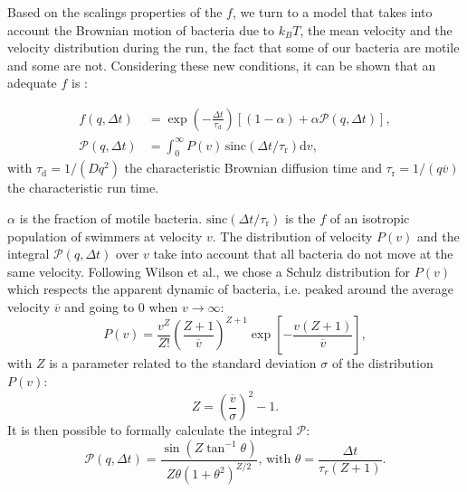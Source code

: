 \documentclass[prb,reprint,amsmath,amssymb]{revtex4-1}
\newcommand{\tg}[1]{{\color{magenta}#1}} %
\begin{document}
Based on the scalings properties of the $f$, we turn to a model that takes into account \tg{the Brownian motion of bacteria due to $k_BT$, the mean velocity and the velocity distribution during the run, the fact that some of our bacteria are motile and some are not. Considering these new conditions, it can be shown that an adequate $f$ is \citep{1_BactMobil}}:

\begin{align}
f(q, \Delta t) &= \exp\left(-\frac{\Delta t}{\tau_\text{d}}\right)\left[(1-\alpha) + \alpha \mathcal{P}(q, \Delta t)\right],\label{eq:fbact}\\
\mathcal{P}(q, \Delta t) &= \int_{0}^{\infty} P(v)\, \text{sinc}(\Delta t/\tau_\text{r}) \mathrm{d}v,
\end{align}
with $\tau_\text{d} = 1/(Dq^2)$ the characteristic Brownian diffusion time and $\tau_\text{r}=1/(q\overline{v})$ the characteristic run time.

$\alpha$ is the fraction of motile bacteria. $\text{sinc}(\Delta t/\tau_\text{r})$ is the $f$ of an isotropic population of swimmers at velocity $v$. The distribution of velocity $P(v)$ and the integral $\mathcal{P}(q, \Delta t)$ over $v$ take into account that all bacteria do not move at the same velocity. Following Wilson et al.\cite{1_BactMobil}, we chose a Schulz distribution for $P(v)$ which respects the apparent dynamic of bacteria, i.e. peaked around the average velocity $\overline{v}$ and going to 0 when $v \rightarrow \infty$:
\begin{equation}
P(v) = \frac{v^Z}{Z!} \left(\frac{Z+1}{\overline{v}}\right)^{Z+1} \exp\left[-\frac{v(Z+1)}{\overline{v}}\right],
\end{equation}
with $Z$ is a parameter related to the standard deviation $\sigma$ of the distribution $P(v)$:
\begin{equation}
Z = \left( \frac{\overline{v}}{\sigma} \right)^2 -1.
\label{eq:sig}
\end{equation}
It is then possible to formally calculate the integral $\mathcal{P}$:
\begin{equation}
\mathcal{P}(q, \Delta t) = \frac{\sin\left(Z\tan^{-1}\theta\right)}{Z\theta\left(1+\theta^2\right)^{Z/2}}\text{, with }\theta = \frac{\Delta t}{\tau_r(Z+1)}. 
\end{equation}
\end{document}
